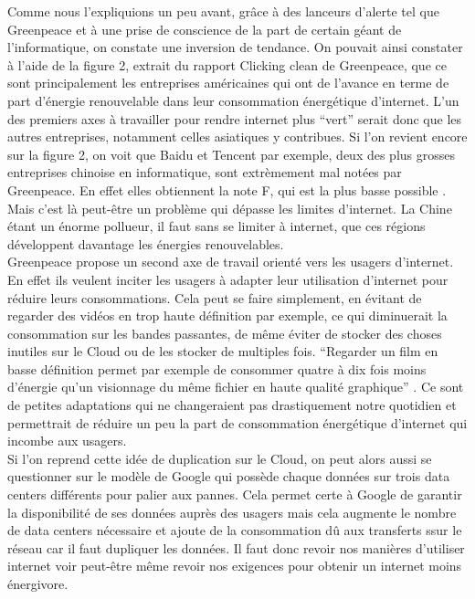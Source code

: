 \documentclass[a4paper,twocolumn,12pt]{article}
\begin{document}
	Comme nous l’expliquions un peu avant, grâce à des lanceurs d’alerte tel que Greenpeace et à une prise de conscience de la part de certain géant de l’informatique, on constate une inversion de tendance. On pouvait ainsi constater à l’aide de la figure 2, extrait du rapport Clicking clean de Greenpeace, que ce sont principalement les entreprises américaines qui ont de l’avance en terme de part d’énergie renouvelable dans leur consommation énergétique d’internet. L’un des premiers axes à travailler pour rendre internet plus “vert” serait donc que les autres entreprises, notamment celles asiatiques y contribues. Si l’on revient encore sur la figure 2, on voit que Baidu et Tencent par exemple, deux des plus grosses entreprises chinoise en informatique, sont extrèmement mal notées par Greenpeace. En effet elles obtiennent la note F, qui est la plus basse possible \cite{3}. Mais c’est là peut-être un problème qui dépasse les limites d’internet. La Chine étant un énorme pollueur, il faut sans se limiter à internet, que ces régions développent davantage les énergies renouvelables. \\

	Greenpeace propose un second axe de travail orienté vers les usagers d’internet. En effet ils veulent inciter les usagers à adapter leur utilisation d’internet pour réduire leurs consommations. Cela peut se faire simplement, en évitant de regarder des vidéos en trop haute définition par exemple, ce qui diminuerait la consommation sur les bandes passantes, de même éviter de stocker des choses inutiles sur le Cloud ou de les stocker de multiples fois. “Regarder un film en basse définition permet par exemple de consommer quatre à dix fois moins d’énergie qu’un visionnage du même fichier en haute qualité graphique” \cite{3}. Ce sont de petites adaptations qui ne changeraient pas drastiquement notre quotidien et permettrait de réduire un peu la part de consommation énergétique d’internet qui incombe aux usagers. \\
	
	Si l’on reprend cette idée de duplication sur le Cloud, on peut alors aussi se questionner sur le modèle de Google qui possède chaque données sur trois data centers différents pour palier aux pannes. Cela permet certe à Google de garantir la disponibilité de ses données auprès des usagers mais cela augmente le nombre de data centers nécessaire et ajoute de la consommation dû aux transferts ssur le réseau car il faut dupliquer les données. Il faut donc revoir nos manières d’utiliser internet voir peut-être même revoir nos exigences pour obtenir un internet moins énergivore. \\
\end{document}
